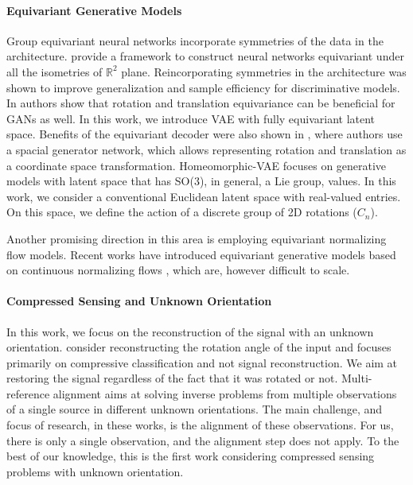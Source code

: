 \paragraph{Equivariant Generative Models}
Group equivariant neural networks \citep{cohen2016group} incorporate symmetries of the data in the architecture. \citet{e2cnn} provide a framework to construct neural networks equivariant under all the isometries of  $\mathbb{R}^2$ plane. Reincorporating symmetries in the architecture was shown to improve generalization and sample efficiency for discriminative models. In \citet{Karras2021-yx} authors show that rotation and translation equivariance can be beneficial for GANs as well.  In this work, we introduce VAE with fully equivariant latent space. Benefits of the equivariant decoder were also shown in \citet{Bepler2019-qi}, where authors use a spacial generator network, which allows representing rotation and translation as a coordinate space transformation. Homeomorphic-VAE \cite{falorsi2018explorations} focuses on generative models with latent space that has SO(3), in general, a Lie group, values. In this work, we consider a conventional Euclidean latent space with real-valued entries. On this space, we deﬁne the action of a discrete group of 2D rotations ($C_n$). 

Another promising direction in this area is employing equivariant normalizing flow models. Recent works have introduced equivariant generative models based on continuous normalizing flows \cite{kohler2020equivariant, satorras2021n}, which are, however difficult to scale. 

\paragraph{Compressed Sensing and Unknown Orientation}
In this work, we focus on the reconstruction of the signal with an unknown orientation. \citet{davenport2007smashed} consider reconstructing the rotation angle of the input and focuses primarily on compressive classiﬁcation and not signal reconstruction. We aim at restoring the signal regardless of the fact that it was rotated or not. Multi-reference alignment \cite{bendory2017bispectrum} aims at solving inverse problems from multiple observations of a single source in different unknown orientations. The main challenge, and focus of research, in these works, is the alignment of these observations. For us, there is only a single observation, and the alignment step does not apply. To the best of our knowledge, this is the first work considering compressed sensing problems with unknown orientation. 


